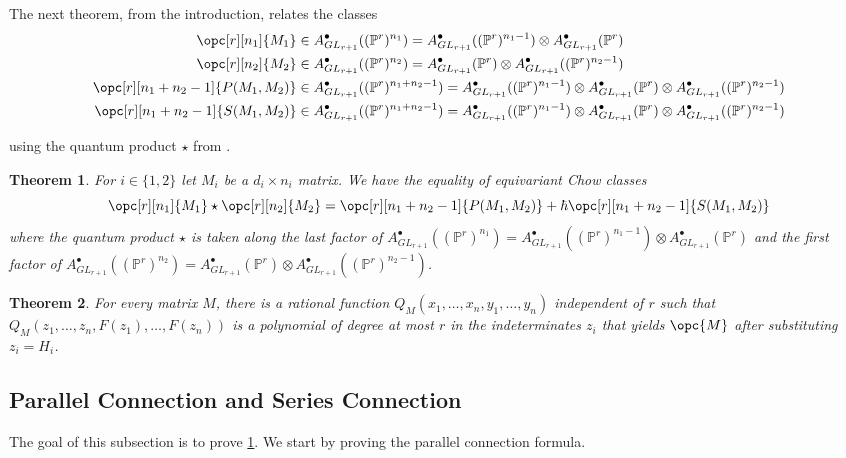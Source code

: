 \documentclass[12pt]{amsart}
\newcommand{\mb}{\mathbb}
\theoremstyle{plain}
\newtheorem{Thm}{Theorem}[section]
\theoremstyle{definition}
\theoremstyle{remark}
\begin{document}
The next theorem,  from the introduction, relates the classes
\begin{align*}
\opc[r][n_1]{M_1} &\in A^\bullet_{GL_{r+1}} ((\mb{P}^r)^{n_1}) = A^\bullet_{GL_{r+1}} ((\mb{P}^r)^{n_1-1}) \otimes A^\bullet_{GL_{r+1}} (\mb{P}^r) \\
\opc[r][n_2]{M_2} &\in A^\bullet_{GL_{r+1}} ((\mb{P}^r)^{n_2}) = A^\bullet_{GL_{r+1}} (\mb{P}^r) \otimes A^\bullet_{GL_{r+1}} ((\mb{P}^r)^{n_2-1}) \\
\opc[r][n_1 + n_2 - 1]{P(M_1, M_2)} &\in A^\bullet_{GL_{r+1}} ((\mb{P}^r)^{n_1 + n_2 - 1}) = A^\bullet_{GL_{r+1}} ((\mb{P}^r)^{n_1-1}) \otimes A^\bullet_{GL_{r+1}} (\mb{P}^r) \otimes A^\bullet_{GL_{r+1}} ((\mb{P}^r)^{n_2-1}) \\
\opc[r][n_1 + n_2 - 1]{S(M_1, M_2)} &\in A^\bullet_{GL_{r+1}} ((\mb{P}^r)^{n_1 + n_2 - 1}) = A^\bullet_{GL_{r+1}} ((\mb{P}^r)^{n_1-1}) \otimes A^\bullet_{GL_{r+1}} (\mb{P}^r) \otimes A^\bullet_{GL_{r+1}} ((\mb{P}^r)^{n_2-1})
\end{align*}

using the quantum product $\star$ from .

\begin{Thm}\label{serpar} For $i \in \{1,2\}$ let $M_i$ be a $d_i \times n_i$ matrix. We have the equality of equivariant Chow classes $$\opc[r][n_1]{M_1} \star \opc[r][n_2]{M_2}=\opc[r][n_1+n_2-1]{P(M_1,M_2)}+\hbar\opc[r][n_1+n_2-1]{S(M_1,M_2)}$$ where the quantum product $\star$ is taken along the last factor of $A^\bullet_{GL_{r+1}} ((\mb{P}^r)^{n_1}) = A^\bullet_{GL_{r+1}} ((\mb{P}^r)^{n_1-1}) \otimes A^\bullet_{GL_{r+1}} (\mb{P}^r)$ and the first factor of $A^\bullet_{GL_{r+1}} ((\mb{P}^r)^{n_2}) = A^\bullet_{GL_{r+1}} (\mb{P}^r) \otimes A^\bullet_{GL_{r+1}} ((\mb{P}^r)^{n_2-1})$.
\end{Thm}

\begin{Thm}\label{formulaexists}
For every matrix $M$, there is a rational function $Q_{M}(x_1,\ldots,x_n,y_1,\ldots,y_n)$ independent of $r$ such that $Q_{M}(z_1,\ldots,z_n,F(z_1),\ldots,F(z_n))$ is a polynomial of degree at most $r$ in the indeterminates $z_i$ that yields $\opc{M}$ after substituting $z_i = H_i$.
\end{Thm}

\subsection{Parallel Connection and Series Connection}
The goal of this subsection is to prove \cref{serpar}. We start by proving the parallel connection formula.
\end{document}
